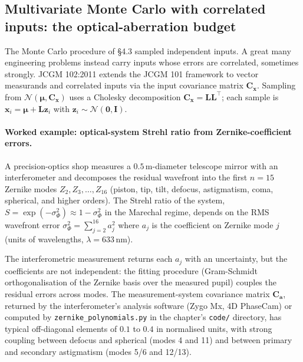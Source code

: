 \subsection{Multivariate Monte Carlo with correlated inputs:
the optical-aberration budget}

The Monte Carlo procedure of §4.3 sampled independent inputs.
A great many engineering problems instead carry inputs whose
errors are correlated, sometimes strongly. JCGM 102:2011
\cite{std:iso-iec-guide98-3} extends the JCGM 101 framework to
vector measurands and correlated inputs via the input covariance
matrix $\mathbf{C}_{\mathbf{x}}$. Sampling from
$\mathcal{N}(\boldsymbol{\mu}, \mathbf{C}_{\mathbf{x}})$ uses a
Cholesky decomposition $\mathbf{C}_{\mathbf{x}} = \mathbf{L}
\mathbf{L}^{\top}$; each sample is
$\mathbf{x}_{i} = \boldsymbol{\mu} + \mathbf{L}\mathbf{z}_{i}$
with $\mathbf{z}_{i} \sim \mathcal{N}(\mathbf{0}, \mathbf{I})$.

\paragraph{Worked example: optical-system Strehl ratio from
Zernike-coefficient errors.} A precision-optics shop measures a
$0.5\,\si{\meter}$-diameter telescope mirror with an
interferometer and decomposes the residual wavefront into the
first $n = 15$ Zernike modes
$Z_{2}, Z_{3}, \ldots, Z_{16}$ (piston, tip, tilt, defocus,
astigmatism, coma, spherical, and higher orders). The Strehl
ratio of the system,
$S = \exp(-\sigma_{\Phi}^{2}) \approx 1 - \sigma_{\Phi}^{2}$
in the Marechal regime, depends on the RMS wavefront error
$\sigma_{\Phi}^{2} = \sum_{j=2}^{16} a_{j}^{2}$ where $a_{j}$
is the coefficient on Zernike mode $j$ (units of wavelengths,
$\lambda = 633\,\si{\nano\meter}$).

The interferometric measurement returns each $a_{j}$ with an
uncertainty, but the coefficients are not independent: the
fitting procedure (Gram-Schmidt orthogonalisation of the
Zernike basis over the measured pupil) couples the residual
errors across modes. The measurement-system covariance matrix
$\mathbf{C}_{\mathbf{a}}$, returned by the interferometer's
analysis software (Zygo Mx, 4D PhaseCam) or computed by
\texttt{zernike\_polynomials.py} in the chapter's \texttt{code/}
directory, has typical off-diagonal elements of $0.1$ to
$0.4$ in normalised units, with strong coupling between
defocus and spherical (modes 4 and 11) and between primary and
secondary astigmatism (modes 5/6 and 12/13).

